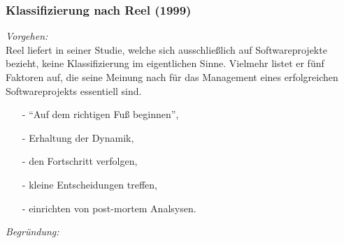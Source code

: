 \noindent
\subsubsection{Klassifizierung nach Reel (1999)}
\textit{Vorgehen:}\\\noindent
Reel liefert in seiner Studie, welche sich ausschließlich auf Softwareprojekte bezieht, keine Klassifizierung im eigentlichen Sinne.
Vielmehr listet er fünf Faktoren auf, die seine Meinung nach für das Management eines erfolgreichen Softwareprojekts essentiell sind.
\begin{itemize}
  \item[-]{"`Auf dem richtigen Fuß beginnen"',}
  \item[-]{Erhaltung der Dynamik,}
  \item[-]{den Fortschritt verfolgen,}
  \item[-]{kleine Entscheidungen treffen,}
  \item[-]{einrichten von post-mortem Analsysen.}  
\end{itemize}
\textit{Begründung:}\\\noindent